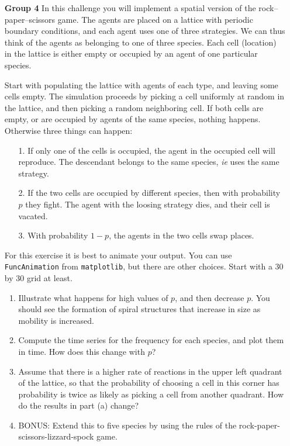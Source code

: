 \documentclass[12pt]{article}
\begin{document}
\begin{enumerate}
\item[\bf Group 4]  In this challenge you will implement a spatial version of the rock--paper--scissors game. The agents
are placed on a lattice with periodic boundary conditions, and each agent uses one of three strategies.  We can 
thus think of the agents as belonging to one of three species.  Each cell (location) in the lattice is either empty or occupied by 
an agent of one particular species.

Start with populating the lattice with agents of each type, and leaving some cells empty.
The simulation proceeds by picking a cell uniformly at random in the lattice, and then picking a random neighboring cell.
If both cells are empty, or are occupied by agents of the same species, nothing happens.  Otherwise three things can happen:
\begin{enumerate}
\item[1.] If only one of the cells is occupied, the agent in the occupied cell will reproduce.
The descendant belongs to the same species, \emph{ie} uses the same strategy.
\item[2.]  If the two cells are occupied by different species, then with probability $p$ they fight. 
The agent with the loosing strategy dies, and their cell is vacated. 
\item[3.] With probability $1-p$, the agents in the two cells swap places.
\end{enumerate}

For this exercise it is best to animate your output.  You can use \verb|FuncAnimation| from \verb|matplotlib|, but there are other choices. 
Start with a 30 by 30 grid at least.

\begin{enumerate}
\item Illustrate what happens for high values of $p$, and then decrease $p$. You should see the formation of spiral structures that increase in size as mobility is increased.
\item Compute the time series for the frequency for each species, and plot them in time.  How does this change with $p$?
\item Assume that there is a higher rate of reactions in the upper left quadrant of the lattice, so that the probability of choosing a 
cell in this corner has probability is twice as likely as picking a cell from another quadrant.  How do the results in part (a) change?
\item BONUS: Extend this to five species by using the rules of the rock-paper-scissors-lizzard-spock game.
\end{enumerate}

\end{enumerate}



\end{document}
